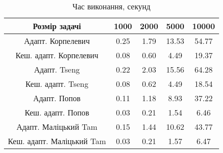 \begin{table}[H]
	\centering
	\begin{tabular}{|c||c|c|c|c|}\hline
		Розмір задачі & 1000 & 2000 & 5000 & 10000 \\ \hline \hline
		Адапт. Корпелевич & 0.25 & 1.79 & 13.53 & 54.77 \\ \hline
		Кеш. адапт. Корпелевич & 0.08 & 0.60 & 4.49 & 19.37 \\ \hline
		Адапт. Tseng & 0.22 & 2.03 & 15.56 & 64.28 \\ \hline
		Кеш. адапт. Tseng & 0.08 & 0.62 & 4.49 & 18.54 \\ \hline
		Адапт. Попов & 0.11 & 1.18 & 8.93 & 37.22 \\ \hline
		Кеш. адапт. Попов & 0.03 & 0.21 & 1.54 & 6.46 \\ \hline
		Адапт. Маліцький Tam & 0.15 & 1.44 & 10.62 & 43.77 \\ \hline
		Кеш. адапт. Маліцький Tam & 0.03 & 0.21 & 1.57 & 6.47 \\ \hline
	\end{tabular}
	\caption{Час виконання, секунд}
\end{table}
